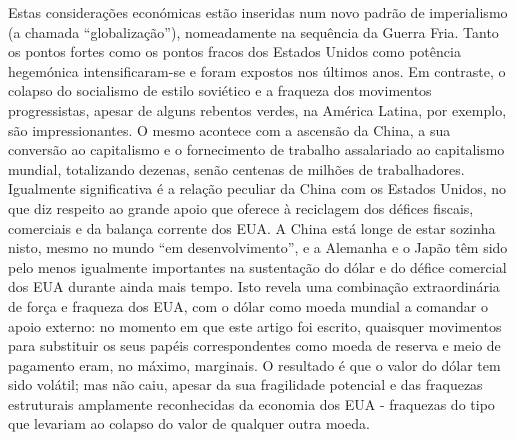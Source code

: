  \par 
Estas considerações económicas estão inseridas num novo padrão de imperialismo (a chamada “globalização”), nomeadamente na sequência da Guerra Fria. Tanto os pontos fortes como os pontos fracos dos Estados Unidos como potência hegemónica intensificaram-se e foram expostos nos últimos anos. Em contraste, o colapso do socialismo de estilo soviético e a fraqueza dos movimentos progressistas, apesar de alguns rebentos verdes, na América Latina, por exemplo, são impressionantes. O mesmo acontece com a ascensão da China, a sua conversão ao capitalismo e o fornecimento de trabalho assalariado ao capitalismo mundial, totalizando dezenas, senão centenas de milhões de trabalhadores. Igualmente significativa é a relação peculiar da China com os Estados Unidos, no que diz respeito ao grande apoio que oferece à reciclagem dos défices fiscais, comerciais e da balança corrente dos EUA. A China está longe de estar sozinha nisto, mesmo no mundo “em desenvolvimento”, e a Alemanha e o Japão têm sido pelo menos igualmente importantes na sustentação do dólar e do défice comercial dos EUA durante ainda mais tempo. Isto revela uma combinação extraordinária de força e fraqueza dos EUA, com o dólar como moeda mundial a comandar o apoio externo: no momento em que este artigo foi escrito, quaisquer movimentos para substituir os seus papéis correspondentes como moeda de reserva e meio de pagamento eram, no máximo, marginais. O resultado é que o valor do dólar tem sido volátil; mas não caiu, apesar da sua fragilidade potencial e das fraquezas estruturais amplamente reconhecidas da economia dos EUA - fraquezas do tipo que levariam ao colapso do valor de qualquer outra moeda.
 \par 

